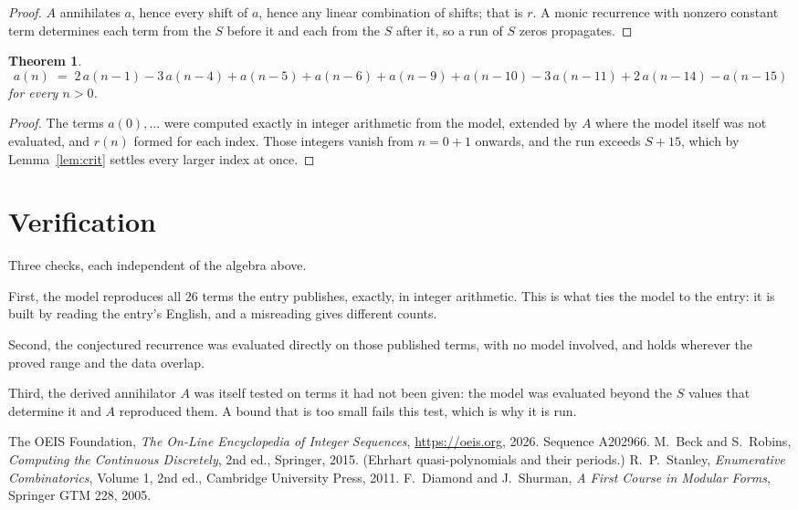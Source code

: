 \documentclass[11pt,a4paper]{article}
\theoremstyle{plain}
\newtheorem{theorem}{Theorem}
\theoremstyle{definition}
\begin{document}
\begin{proof}
$A$ annihilates $a$, hence every shift of $a$, hence any linear combination of shifts; that is
$r$. A monic recurrence with nonzero constant term determines each term from the $S$ before it
and each from the $S$ after it, so a run of $S$ zeros propagates.
\end{proof}

\begin{theorem}
\[
a(n)\;=\;2\,a(n-1) - 3\,a(n-4) + a(n-5) + a(n-6) + a(n-9) + a(n-10) - 3\,a(n-11) + 2\,a(n-14) - a(n-15)
\]
for every $n>0$.
\end{theorem}

\begin{proof}
The terms $a(0),\dots$ were computed exactly in integer arithmetic from the model, extended by
$A$ where the model itself was not evaluated, and $r(n)$ formed for each index. Those integers
vanish from $n=0+1$ onwards, and the run exceeds $S+15$, which by
Lemma~\ref{lem:crit} settles every larger index at once.
\end{proof}

\section{Verification}

Three checks, each independent of the algebra above.

First, the model reproduces all $26$ terms the entry publishes, exactly, in integer
arithmetic. This is what ties the model to the entry: it is built by reading the entry's
English, and a misreading gives different counts.

Second, the conjectured recurrence was evaluated directly on those published terms, with no
model involved, and holds wherever the proved range and the data overlap.

Third, the derived annihilator $A$ was itself tested on terms it had not been given: the model
was evaluated beyond the $S$ values that determine it and $A$ reproduced them. A bound that is
too small fails this test, which is why it is run.

\begin{thebibliography}{9}
 The OEIS Foundation, \emph{The On-Line Encyclopedia of Integer
Sequences}, \url{https://oeis.org}, 2026. Sequence A202966.
 M.~Beck and S.~Robins, \emph{Computing the Continuous Discretely},
2nd ed., Springer, 2015. (Ehrhart quasi-polynomials and their periods.)
 R.~P.~Stanley, \emph{Enumerative Combinatorics}, Volume 1, 2nd ed.,
Cambridge University Press, 2011.
 F.~Diamond and J.~Shurman, \emph{A First Course in Modular Forms},
Springer GTM 228, 2005.
\end{thebibliography}
\end{document}
